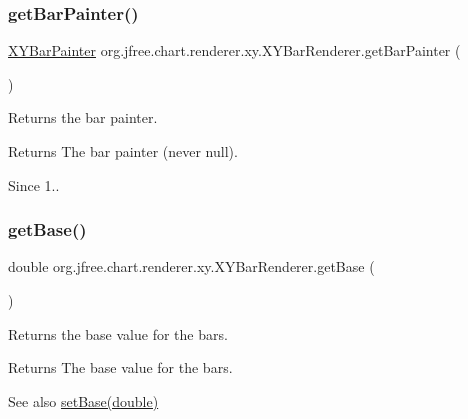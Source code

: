 \subsubsection{\texorpdfstring{get\+Bar\+Painter()}{getBarPainter()}}
{\footnotesize\ttfamily \mbox{\hyperlink{interfaceorg_1_1jfree_1_1chart_1_1renderer_1_1xy_1_1_x_y_bar_painter}{X\+Y\+Bar\+Painter}} org.\+jfree.\+chart.\+renderer.\+xy.\+X\+Y\+Bar\+Renderer.\+get\+Bar\+Painter (\begin{DoxyParamCaption}{ }\end{DoxyParamCaption})}

Returns the bar painter.

\begin{DoxyReturn}{Returns}
The bar painter (never {\ttfamily null}).
\end{DoxyReturn}
\begin{DoxySince}{Since}
1.. 
\end{DoxySince}
\mbox{\label{classorg_1_1jfree_1_1chart_1_1renderer_1_1xy_1_1_x_y_bar_renderer_a8d8a8dbb9dfd5028a0fc790a494b780a}} 
\subsubsection{\texorpdfstring{get\+Base()}{getBase()}}
{\footnotesize\ttfamily double org.\+jfree.\+chart.\+renderer.\+xy.\+X\+Y\+Bar\+Renderer.\+get\+Base (\begin{DoxyParamCaption}{ }\end{DoxyParamCaption})}

Returns the base value for the bars.

\begin{DoxyReturn}{Returns}
The base value for the bars.
\end{DoxyReturn}
\begin{DoxySeeAlso}{See also}
\mbox{\hyperlink{classorg_1_1jfree_1_1chart_1_1renderer_1_1xy_1_1_x_y_bar_renderer_ad0902f54cf21048caccba61885f0f30d}{set\+Base(double)}} 
\end{DoxySeeAlso}
\mbox{\label{classorg_1_1jfree_1_1chart_1_1renderer_1_1xy_1_1_x_y_bar_renderer_a08c02ef501d62efdb4a4a7ab36dfb9ec}} 
